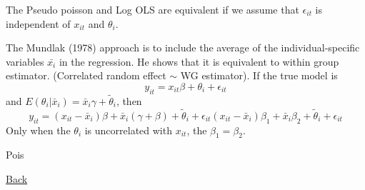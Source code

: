 \begin{remark}
    The Pseudo poisson and Log OLS are equivalent if we assume that $\epsilon_{it}$ is independent of $x_{it}$ and $\theta_i$.
\end{remark}

\begin{remark}
    The Mundlak (1978) approach is to include the average of the individual-specific variables $\bar{x_i}$ in the regression. He shows that it is equivalent to within group estimator.
    (Correlated random effect $\sim$ WG estimator). If the true model is \begin{equation*}
        y_{it}=x_{it}\beta+\theta_i+\epsilon_{it}
    \end{equation*} and $E(\theta_i|\bar{x}_i)=\bar{x}_i\gamma+\tilde{\theta}_i$, then
    \begin{equation*}
        y_{it}=(x_{it}-\bar{x}_i)\beta+\bar{x}_i(\gamma+\beta)+\tilde{\theta}_i+\epsilon_{it}
        (x_{it}-\bar{x}_i)\beta_1+\bar{x}_i\beta_2+\tilde{\theta}_i+\epsilon_{it}
    \end{equation*}
    Only when the $\theta_i$ is uncorrelated with $x_{it}$, the $\beta_1 = \beta_2$.
\end{remark}

\newpage
\hypertarget{reg_inf_pois_2022}{Pois}

\hyperlink{home}{Back}
\bigskip

